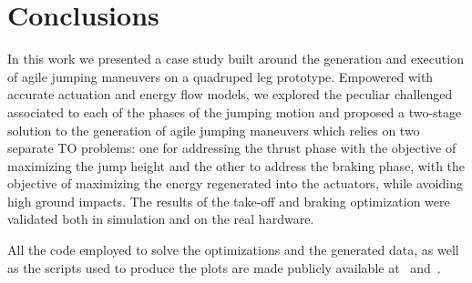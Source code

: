 \section{Conclusions}\label{sec:conclusions}
In this work we presented a case study built around the generation and execution of agile jumping maneuvers on a quadruped leg prototype.  
Empowered with accurate actuation and energy flow models, we explored the peculiar challenged associated to each of the phases of the jumping motion and proposed a two-stage solution to the generation of agile jumping maneuvers which relies on two separate TO problems: one for addressing the thrust phase with the objective of maximizing the jump height and the other to address the braking phase, with the objective of maximizing the energy regenerated into the actuators, while avoiding high ground impacts.
The results of the take-off and braking optimization were validated both in simulation and on the real hardware.

All the code employed to solve the optimizations and the generated data, as well as the scripts used to produce the plots are made publicly available at~\cite{url::awesome_leg_repo} and~\cite{url::data_link}.